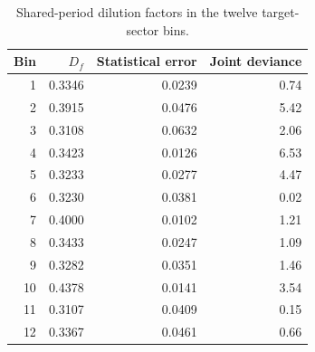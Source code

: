 \begin{longtable}{rrrr}
\caption{Shared-period dilution factors in the twelve target-sector bins.}\\
\toprule Bin & $D_f$ & Statistical error & Joint deviance\\\midrule\endhead
1 & 0.3346 & 0.0239 & 0.74\\
2 & 0.3915 & 0.0476 & 5.42\\
3 & 0.3108 & 0.0632 & 2.06\\
4 & 0.3423 & 0.0126 & 6.53\\
5 & 0.3233 & 0.0277 & 4.47\\
6 & 0.3230 & 0.0381 & 0.02\\
7 & 0.4000 & 0.0102 & 1.21\\
8 & 0.3433 & 0.0247 & 1.09\\
9 & 0.3282 & 0.0351 & 1.46\\
10 & 0.4378 & 0.0141 & 3.54\\
11 & 0.3107 & 0.0409 & 0.15\\
12 & 0.3367 & 0.0461 & 0.66\\
\bottomrule\end{longtable}

